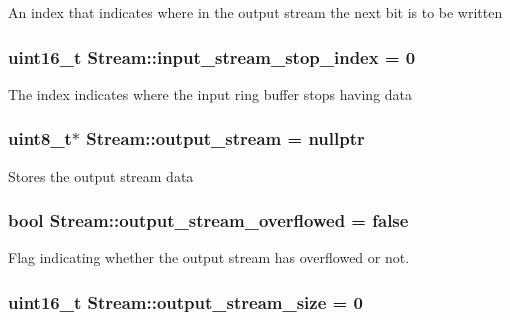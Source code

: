 An index that indicates where in the output stream the next bit is to be written \hypertarget{class_stream_a52cf2f675dd7ec342615e82cc29513de}{
\subsubsection[{input\-\_\-stream\-\_\-stop\-\_\-index}]{\setlength{\rightskip}{0pt plus 5cm}uint16\-\_\-t Stream\-::input\-\_\-stream\-\_\-stop\-\_\-index = 0\hspace{0.3cm}{\ttfamily [protected]}}}\label{class_stream_a52cf2f675dd7ec342615e82cc29513de}
The index indicates where the input ring buffer stops having data \hypertarget{class_stream_ab2d136f405b24e5eb2a6058b24fabfa3}{
\subsubsection[{output\-\_\-stream}]{\setlength{\rightskip}{0pt plus 5cm}uint8\-\_\-t$\ast$ Stream\-::output\-\_\-stream = nullptr\hspace{0.3cm}{\ttfamily [protected]}}}\label{class_stream_ab2d136f405b24e5eb2a6058b24fabfa3}
Stores the output stream data \hypertarget{class_stream_a91eb40b21c46bd57b61811a890ac047a}{
\subsubsection[{output\-\_\-stream\-\_\-overflowed}]{\setlength{\rightskip}{0pt plus 5cm}bool Stream\-::output\-\_\-stream\-\_\-overflowed = false\hspace{0.3cm}{\ttfamily [protected]}}}\label{class_stream_a91eb40b21c46bd57b61811a890ac047a}
Flag indicating whether the output stream has overflowed or not. \hypertarget{class_stream_a3a171d646ab70eeb9c034aecb3a72003}{
\subsubsection[{output\-\_\-stream\-\_\-size}]{\setlength{\rightskip}{0pt plus 5cm}uint16\-\_\-t Stream\-::output\-\_\-stream\-\_\-size = 0\hspace{0.3cm}{\ttfamily [protected]}}}\label{class_stream_a3a171d646ab70eeb9c034aecb3a72003}
